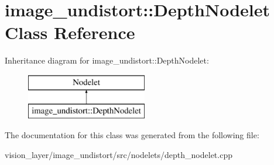 \hypertarget{classimage__undistort_1_1DepthNodelet}{}\section{image\+\_\+undistort\+:\+:Depth\+Nodelet Class Reference}
\label{classimage__undistort_1_1DepthNodelet}
Inheritance diagram for image\+\_\+undistort\+:\+:Depth\+Nodelet\+:\begin{figure}[H]
\begin{center}
\leavevmode
\includegraphics[height=2.000000cm]{classimage__undistort_1_1DepthNodelet}
\end{center}
\end{figure}


The documentation for this class was generated from the following file\+:\begin{DoxyCompactItemize}
\item 
vision\+\_\+layer/image\+\_\+undistort/src/nodelets/depth\+\_\+nodelet.\+cpp\end{DoxyCompactItemize}
